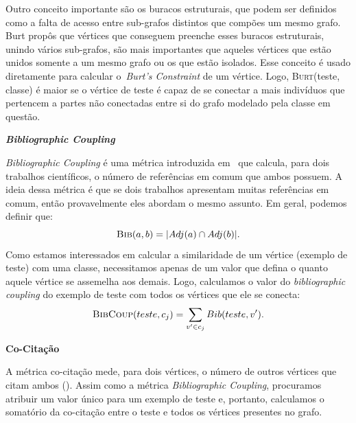 \begin{description}
Outro conceito importante são os buracos estruturais, que podem ser definidos como a falta de acesso entre sub-grafos distintos que compões um mesmo grafo. Burt propôs que vértices que conseguem preenche esses buracos estruturais, unindo vários sub-grafos, são mais importantes que aqueles vértices que estão unidos somente a um mesmo grafo ou os que estão isolados. Esse conceito é usado diretamente para calcular o~\textit{Burt's Constraint} de um vértice. Logo, \textsc{Burt}(teste, classe) é maior se o vértice de teste é capaz de se conectar a mais indivíduos que pertencem a partes não conectadas entre si do grafo modelado pela classe em questão.

\item{\textbf{\textit{Bibliographic Coupling}}}
\label{item::bibcoup}

\textit{Bibliographic Coupling} é uma métrica introduzida em~\cite{Kessler63} que calcula, para dois trabalhos científicos, o número de referências em comum que ambos possuem. A ideia dessa métrica é que se dois trabalhos apresentam muitas referências em comum, então provavelmente eles abordam o mesmo assunto. Em geral, podemos definir que:
\begin{equation}
\textsc{Bib}(a, b) =  |Adj(a) \cap Adj(b)|.
\end{equation}
Como estamos interessados em calcular a similaridade de um vértice (exemplo de teste) com uma classe, necessitamos apenas de um valor que defina o quanto aquele vértice se assemelha aos demais. Logo, calculamos o valor do \textit{bibliographic coupling} do exemplo de teste com todos os vértices que ele se conecta:
\begin{equation}
\textsc{BibCoup}(teste, c_j) =  \sum\limits_{v' \in c_j} Bib(teste, v').
\end{equation}

\item{\textbf{Co-Citação}}
\label{item::cocitation}

A métrica co-citação mede, para dois vértices, o número de outros vértices que citam ambos (\cite{Small73}). Assim como a métrica \textit{Bibliographic Coupling}, procuramos atribuir um valor único para um exemplo de teste e, portanto, calculamos o somatório da co-citação entre o teste e todos os vértices presentes no grafo.


\end{description}
